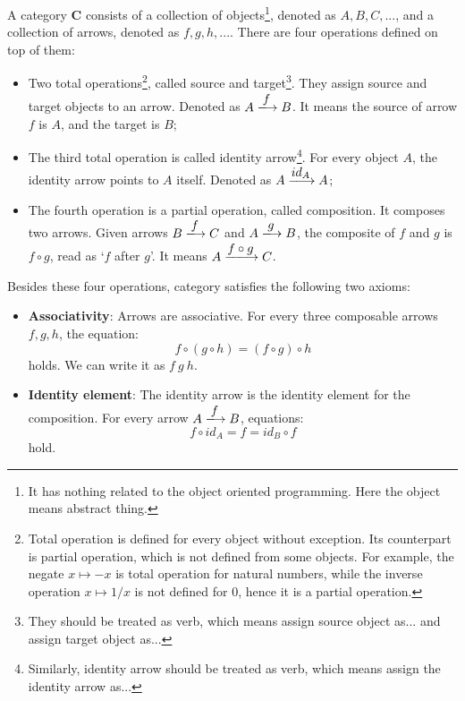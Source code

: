 \documentclass[b5paper]{article}
\begin{document}
 
\begin{definition}
\normalfont
A category $\pmb{C}$ consists of a collection of objects\footnote{It has nothing related to the object oriented programming. Here the object means abstract thing.}, denoted as $A, B, C, ...$, and a collection of arrows, denoted as $f, g, h, ...$. There are four operations defined on top of them:
\begin{itemize}
\item Two total operations\footnote{Total operation is defined for every object without exception. Its counterpart is partial operation, which is not defined from some objects. For example, the negate $x \mapsto -x$ is total operation for natural numbers, while the inverse operation $x \mapsto 1/x$ is not defined for 0, hence it is a partial operation.}, called source and target\footnote{They should be treated as verb, which means assign source object as... and assign target object as...}. They assign source and target objects to an arrow. Denoted as $A \arrowto{f} B$. It means the source of arrow $f$ is $A$, and the target is $B$;

\item The third total operation is called identity arrow\footnote{Similarly, identity arrow should be treated as verb, which means assign the identity arrow as...}. For every object $A$, the identity arrow points to $A$ itself. Denoted as $A \arrowto{id_A} A$;

\item The fourth operation is a partial operation, called composition. It composes two arrows. Given arrows $B \arrowto{f} C$ and $A \arrowto{g} B$, the composite of $f$ and $g$ is $f \circ g$, read as `$f$ after $g$'. It means $A \arrowto{f \circ g} C$.

\end{itemize}

Besides these four operations, category satisfies the following two axioms:

\begin{itemize}
\item \textbf{Associativity}: Arrows are associative. For every three composable arrows $f, g, h$, the equation:
\[
f \circ (g \circ h) = (f \circ g) \circ h
\]
holds. We can write it as $f\ g\ h$.
\item \textbf{Identity element}: The identity arrow is the identity element for the composition. For every arrow $A \arrowto{f} B$, equations:
\[
f \circ id_A = f = id_B \circ f
\]
hold.
\end{itemize}
\end{definition}
\end{document}
